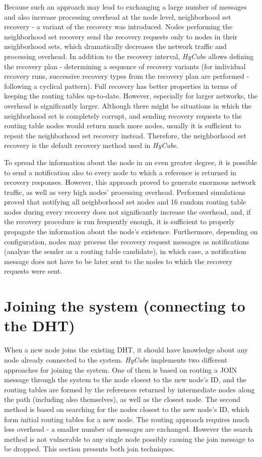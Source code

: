 Because such an approach may lead to exchanging a large number of messages and also increase processing overhead at the node level, neighborhood set recovery - a variant of the recovery was introduced. Nodes performing the neighborhood set recovery send the recovery requests only to nodes in their neighborhood sets, which dramatically decreases the network traffic and processing overhead. In addition to the recovery interval, \emph{HyCube} allows defining the recovery plan - determining a sequence of recovery variants (for individual recovery runs, successive recovery types from the recovery plan are performed - following a cyclical pattern). Full recovery has better properties in terms of keeping the routing tables up-to-date. However, especially for larger networks, the overhead is significantly larger. Although there might be situations in which the neighborhood set is completely corrupt, and sending recovery requests to the routing table nodes would return much more nodes, usually it is sufficient to repeat the neighborhood set recovery instead. Therefore, the neighborhood set recovery is the default recovery method used in \emph{HyCube}.

To spread the information about the node in an even greater degree, it is possible to send a notification also to every node to which a reference is returned in recovery responses. However, this approach proved to generate enormous network traffic, as well as very high nodes' processing overhead. Performed simulations proved that notifying all neighborhood set nodes and 16 random routing table nodes during every recovery does not significantly increase the overhead, and, if the recovery procedure is run frequently enough, it is sufficient to properly propagate the information about the node's existence. Furthermore, depending on configuration, nodes may process the recovery request messages as notifications (analyze the sender as a routing table candidate), in which case, a notification message does not have to be later sent to the nodes to which the recovery requests were sent.




\section{Joining the system (connecting to the DHT)}

When a new node joins the existing DHT, it should have knowledge about any node already connected to the system. \emph{HyCube} implements two different approaches for joining the system. One of them is based on routing a JOIN message through the system to the node closest to the new node's ID, and the routing tables are formed by the references returned by intermediate nodes along the path (including also themselves), as well as the closest node. The second method is based on searching for the nodes closest to the new node's ID, which form initial routing tables for a new node. The routing approach requires much less overhead - a smaller number of messages are exchanged. However the search method is not vulnerable to any single node possibly causing the join message to be dropped. This section presents both join techniques.



